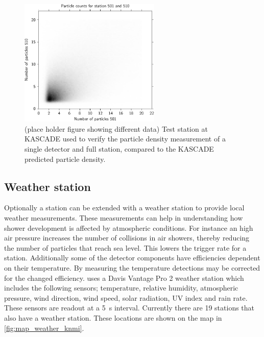 \begin{figure}
    \centering
    \includegraphics[width=0.6\textwidth]
                    {plots/experiment/n_501_510_sum}
    \caption{(place holder figure showing different data) Test station at KASCADE used to verify the particle density measurement of a single detector and full station, compared to the KASCADE predicted particle density.}
    \label{fig:n_501_510_sum}
\end{figure}


\subsection{Weather station}

Optionally a \hisparc station can be extended with a weather station to provide local weather measurements. These measurements can help in understanding how shower development is affected by atmospheric conditions. For instance an high air pressure increases the number of collisions in air showers, thereby reducing the number of particles that reach sea level. This lowers the trigger rate for a station. Additionally some of the detector components have efficiencies dependent on their temperature. By measuring the temperature detections may be corrected for the changed efficiency. \hisparc uses a Davis Vantage Pro 2 weather station \cite{davis2012vantagepro} which includes the following sensors; temperature, relative humidity, atmospheric pressure, wind direction, wind speed, solar radiation, UV index and rain rate. These sensors are readout at a \SI{5}{\second} interval. Currently there are 19 \hisparc stations that also have a weather station. These locations are shown on the map in \cref{fig:map_weather_knmi}.


